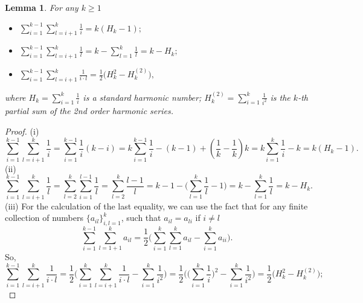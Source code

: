 \documentclass{tpms-l}
\newtheorem{lemma}[theorem]{Lemma}
\theoremstyle{definition}
\theoremstyle{remark}
\numberwithin{equation}{section}
\begin{document}
\begin{lemma}\label{lem1}
For any $k\geq 1$
\begin{itemize}
\item[(i)]  $\sum_{i=1}^{k-1}\sum_{l=i+1}^{k}\frac{1}{i}  =  k(H_k-1);$
\item[(ii)] $\sum_{i=1}^{k-1} \sum_{l=i+1}^{k} \frac{1}{l}  = k-\sum_{l=1}^{k}\frac{1}{l}=k-H_k;$
\item[(iii)] $\sum_{i=1}^{k-1} \sum_{l=i+1}^{k} \frac{1}{i\cdot l}  =  \frac{1}{2}\bigg(H_k^2-H_k^{\left(2\right)}\bigg),$   
\end{itemize}
where  $H_k=\sum_{i=1}^{k} \frac{1}{i}$ is a standard harmonic number; 
      $H_k^{\left(2\right)}=\sum_{i=1}^{k} \frac{1}{i^2}$ is the $k$-th partial sum of the 2nd order harmonic series.
\end{lemma}
\begin{proof}
(i) \[
\sum_{i=1}^{k-1}\sum_{l=i+1}^{k}\frac{1}{i} = \sum_{i=1}^{k-1}\frac{1}{i}(k-i) = k \sum_{i=1}^{k-1}\frac{1}{i} - (k-1) + (\frac{1}{k} - \frac{1}{k})k = k \sum_{i=1}^{k}\frac{1}{i} - k = k(H_k-1).
\]
(ii)  $$
     \sum_{i=1}^{k-1} \sum_{l=i+1}^{k} \frac{1}{l}=\sum_{l=2}^{k} \sum_{i=1}^{l-1} \frac{1}{l}=\sum_{l=2}^{k}\frac{l-1}{l} =k-1-\bigg(\sum_{l=1}^{k}\frac{1}{l}-1\bigg)=k-\sum_{l=1}^{k}\frac{1}{l}=k-H_k.
     $$
(iii) For the calculation of the last equality, we can use the fact  that for any finite collection of numbers $\{a_{il}\}_{i,l=1}^{k}$, such that $a_{il}=a_{li}$ if $i\neq l$ 
  $$\sum_{i=1}^{k-1} \sum_{l=1+1}^{k}a_{il}=\frac{1}{2}\bigg(\sum_{i=1}^{k} \sum_{l=1}^{k} a_{il}-\sum_{i=1}^{k}a_{ii}\bigg).$$ 
  So, 
$$\sum_{i=1}^{k-1} \sum_{l=i+1}^{k} \frac{1}{i\cdot l}= \frac{1}{2}\bigg(\sum_{i=1}^{k} \sum_{l=i+1}^{k} \frac{1}{i\cdot l}-\sum_{i=1}^{k} \frac{1}{i^2}\bigg) = \frac{1}{2}\bigg(\bigg(\sum_{i=1}^{k} \frac{1}{i}\bigg)^2 -\sum_{i=1}^{k} \frac{1}{i^2}\bigg) = \frac{1}{2}\bigg(H_k^2-H_k^{\left(2\right)}\bigg);
$$
\end{proof}
\end{document}
